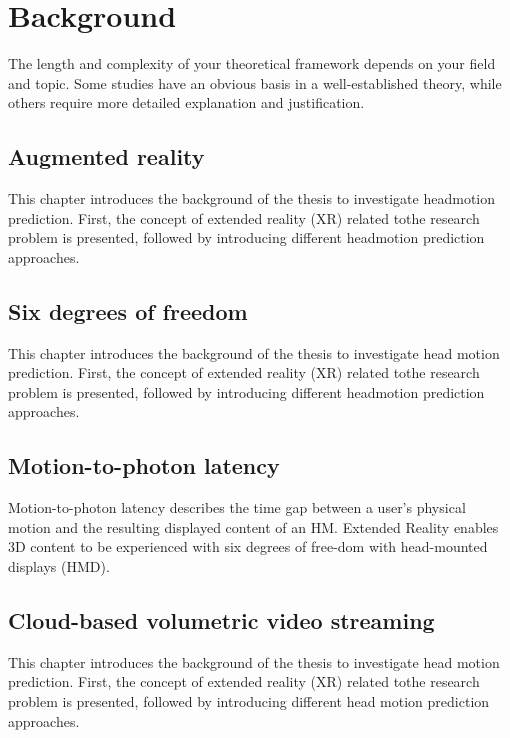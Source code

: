 \chapter{Background}
\label{sec:theorie}
The length and complexity of your theoretical framework depends on your field and topic. Some studies have an obvious basis in a well-established theory, while others require more detailed explanation and justification.



\section{Augmented reality}
\label{sec:theorie:ar}

This chapter introduces the background of the thesis to investigate headmotion prediction. First, the concept of extended reality (XR) related tothe research problem is presented, followed by introducing different headmotion prediction approaches. 

\section{Six degrees of freedom}
\label{sec:theorie:6dof}

This chapter introduces the background of the thesis to investigate head motion prediction. First, the concept of extended reality (XR) related tothe research problem is presented, followed by introducing different headmotion prediction approaches. 

\section{Motion-to-photon latency}
\label{sec:theorie:m2p}

Motion-to-photon latency describes the time gap between a user’s physical motion and the resulting displayed content of an HM. Extended Reality enables 3D content to be experienced with six degrees of free-dom with head-mounted displays (HMD). 

\section{Cloud-based volumetric video streaming}
\label{sec:theorie:cloud}

This chapter introduces the background of the thesis to investigate head motion prediction. First, the concept of extended reality (XR) related tothe research problem is presented, followed by introducing different head motion prediction approaches. 

